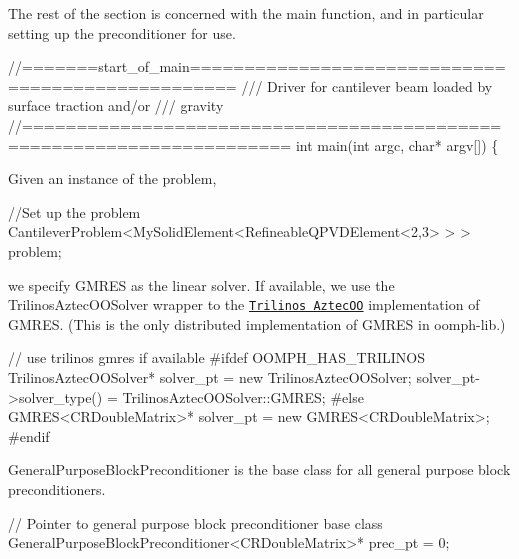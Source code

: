 The rest of the section is concerned with the main function, and in particular setting up the preconditioner for use.

 
\begin{DoxyCodeInclude}
\textcolor{comment}{//=======start\_of\_main==================================================}
\textcolor{comment}{/// Driver for cantilever beam loaded by surface traction and/or}
\textcolor{comment}{}\textcolor{comment}{/// gravity}
\textcolor{comment}{}\textcolor{comment}{//======================================================================}
\textcolor{keywordtype}{int} main(\textcolor{keywordtype}{int} argc, \textcolor{keywordtype}{char}* argv[])
\{

\end{DoxyCodeInclude}


Given an instance of the problem,

 
\begin{DoxyCodeInclude}
 \textcolor{comment}{//Set up the problem}
 CantileverProblem<MySolidElement<RefineableQPVDElement<2,3> > > problem;

\end{DoxyCodeInclude}


we specify G\+M\+R\+ES as the linear solver. If available, we use the {\ttfamily Trilinos\+Aztec\+O\+O\+Solver} wrapper to the \href{http://trilinos.sandia.gov/packages/aztecoo/}{\tt {\ttfamily Trilinos Aztec\+OO}} implementation of G\+M\+R\+ES. (This is the only distributed implementation of G\+M\+R\+ES in {\ttfamily oomph-\/lib}.)

 
\begin{DoxyCodeInclude}
 \textcolor{comment}{// use trilinos gmres if available}
\textcolor{preprocessor}{#ifdef OOMPH\_HAS\_TRILINOS}
 TrilinosAztecOOSolver* solver\_pt = \textcolor{keyword}{new} TrilinosAztecOOSolver;
 solver\_pt->solver\_type() = TrilinosAztecOOSolver::GMRES;
\textcolor{preprocessor}{#else}
 GMRES<CRDoubleMatrix>* solver\_pt = \textcolor{keyword}{new} GMRES<CRDoubleMatrix>;
\textcolor{preprocessor}{#endif}

\end{DoxyCodeInclude}


{\ttfamily General\+Purpose\+Block\+Preconditioner} is the base class for all general purpose block preconditioners.

 
\begin{DoxyCodeInclude}
 \textcolor{comment}{// Pointer to general purpose block preconditioner base class}
 GeneralPurposeBlockPreconditioner<CRDoubleMatrix>* prec\_pt = 0;

\end{DoxyCodeInclude}


